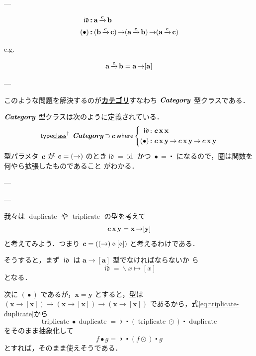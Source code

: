 \documentclass[a5paper,twoside,fleqn,draft]{jsbook}
\newcommand{\keyword}[1]{{\underline{\textbf{#1}}}}
\newcommand{\mKeyword}[1]{\mathsf{#1}}
\newcommand{\mKeywordUnderline}[1]{\text{\underline{\textsf{#1}}}}
\newcommand{\mTypeClassDeclKeyword}{\mKeyword{type}\mKeywordUnderline{class}}
\newcommand{\mWhereKeyword}{\mKeyword{where}}
\newcommand{\mPolymorphic}[1]{{#1}^\dagger}
\DeclareMathOperator{\mSuperSet}{\supset}
\DeclareMathOperator{\mTypeClassDeclPolymorphic}{\mPolymorphic{\mTypeClassDeclKeyword}}
\DeclareMathOperator{\mWhere}{\mWhereKeyword}
\newcommand{\mAnonParam}{\diamond}
\newcommand{\mSpecialFunc}[1]{\mathrm{#1}}
\newcommand{\mVarSpecialFunc}[1]{\mathfrak{#1}}
\DeclareMathOperator{\mDuplicate}{\mSpecialFunc{duplicate}}
\DeclareMathOperator{\mId}{\mSpecialFunc{id}}
\DeclareMathOperator{\mIdCat}{\mVarSpecialFunc{id}}
\DeclareMathOperator{\mTriplicate}{\mSpecialFunc{triplicate}}
\newcommand{\mCatArrow}[1]{\xrightarrow{#1}}
\DeclareMathOperator{\mCatArrowC}{\mCatArrow{\mPolymorphicTypeParameter{c}}}
\DeclareMathOperator{\mCompFunc}{\centerdot}
\DeclareMathOperator{\mCompCat}{\bullet}
\DeclareMathOperator{\mFuncArrow}{\rightarrow}
\DeclareMathOperator{\mIn}{{:\!:}}
\DeclareMathOperator{\mJoinList}{\flat} %
\DeclareMathOperator{\mLambda}{\backslash}
\DeclareMathOperator{\mLambdaArrow}{\mapsto}
\DeclareMathOperator{\mMapList}{\odot}
\newcommand{\mType}[1]{\mathbf{#1}} %
\newcommand{\mPolymorphicTypeParameter}[1]{\textbf{\textit{#1}}}
\newcommand{\mA}{\mType{a}}
\newcommand{\mB}{\mType{b}}
\newcommand{\mC}{\mType{c}}
\newcommand{\mX}{\mType{x}}
\newcommand{\mY}{\mType{y}}
\newcommand{\mTypeClass}[1]{\textbf{\textit{#1}}}
\newcommand{\mCatTypeClass}{\mTypeClass{Category}}
\begin{document}
---

\begin{align}
  \mIdCat
  &\mIn{}\mA\mCatArrowC\mB\\
  (\mCompCat)
  &\mIn{}(\mB\mCatArrowC\mC)
  \mFuncArrow(\mA\mCatArrowC\mB)
  \mFuncArrow(\mA\mCatArrowC\mC)
\end{align}

e.g.

\begin{equation}
  \mA\mCatArrowC\mB
  =\mA\mFuncArrow[\mA]
\end{equation}

---


このような問題を解決するのが\keyword{カテゴリ}すなわち
$\mCatTypeClass$ 型クラスである．

$\mCatTypeClass$ 型クラスは次のように定義されている．
\begin{equation}
  \mTypeClassDeclPolymorphic\;
  \mCatTypeClass\mSuperSet\mPolymorphicTypeParameter{c}
  \mWhere\left\{
  \begin{aligned}
    \mIdCat&\mIn\mPolymorphicTypeParameter{c}\,\mX\,\mX\\
    (\mCompCat)
    &\mIn\mPolymorphicTypeParameter{c}\,\mX\,\mY
    \mFuncArrow\mPolymorphicTypeParameter{c}\,\mX\,\mY
    \mFuncArrow\mPolymorphicTypeParameter{c}\,\mX\,\mY
  \end{aligned}
  \right.
\end{equation}
型パラメタ $\mPolymorphicTypeParameter{c}$ が
$\mPolymorphicTypeParameter{c}=(\mFuncArrow)$ のとき$\mIdCat=\mId$ かつ
$\mCompCat=\mCompFunc$ になるので，圏は関数を何やら拡張したものであること
がわかる．

---

---

我々は $\mDuplicate$ や $\mTriplicate$ の型を考えて
\begin{equation}
  \mPolymorphicTypeParameter{c}\,\mX\,\mY
  =\mX\mFuncArrow[\mY]
\end{equation}
と考えてみよう．つまり
$\mPolymorphicTypeParameter{c}=((\mFuncArrow)\mAnonParam[\mAnonParam])$
と考えるわけである．

そうすると，まず $\mIdCat$ は $\mA\mFuncArrow[\mA]$ 型でなければならないか
ら
\begin{equation}
  \label{eq:id-category}
  \mIdCat
  =\mLambda x\mLambdaArrow[x]
\end{equation}
となる．

次に $(\mCompCat)$ であるが，$\mX=\mY$ とすると，型は
$(\mX\mFuncArrow[\mX])\mFuncArrow(\mX\mFuncArrow[\mX])\mFuncArrow(\mX\mFuncArrow[\mX])$
であるから，式\eqref{eq:triplicate-duplicate}から
\begin{equation}
  \mTriplicate\mCompCat\mDuplicate
  =\mJoinList\mCompFunc{}(\mTriplicate\mMapList)\mCompFunc\mDuplicate
\end{equation}
をそのまま抽象化して
\begin{equation}
  \label{eq:triplicate-duplicate-comp}
  f\mCompCat g=\mJoinList\mCompFunc{}(f\mMapList)\mCompFunc g
\end{equation}
とすれば，そのまま使えそうである．
\end{document}
